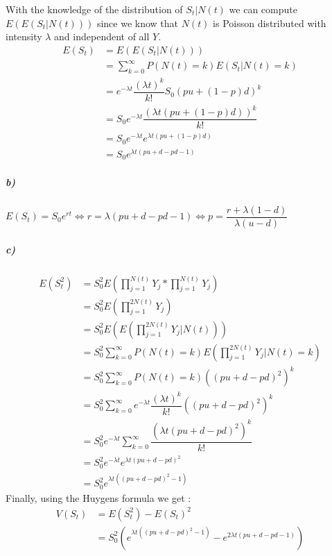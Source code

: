 \documentclass{article}
\begin{document}
With the knowledge of the distribution of $S_t|N(t)$ we can compute 
$E(E(S_t|N(t)))$ since we know that $N(t)$ is Poisson distributed with intensity $\lambda$ and independent of all $Y$.
\begin{align*}
 \displaystyle E(S_t)&=E(E(S_t|N(t))) \\
 &= \sum_{k=0}^{\infty} P(N(t)=k)E(S_t|N(t)=k) \\
 &=e^{-\lambda t}\dfrac{(\lambda t)^k}{k!}S_0(pu+(1-p)d)^k \\
 &=S_0 e^{-\lambda t}\dfrac{(\lambda t(pu+(1-p)d))^k}{k!} \\
 &=S_0e^{-\lambda t}e^{\lambda t(pu+(1-p)d)} \\
 &=S_0e^{\lambda t(pu+d-pd-1)} 
\end{align*}
\subparagraph{b)}
$E(S_t)=S_0e^{rt} \iff r=\lambda(pu+d-pd-1) \iff p=\dfrac{r+\lambda(1-d)}{\lambda(u-d)} $
\subparagraph{c)}
\begin{align*}
E(S_t^2)&=S_0^2E(\prod_{j=1}^{N(t)}Y_j*\prod_{j=1}^{N(t)}Y_j) \\
&=S_0^2E(\prod_{j=1}^{2N(t)}Y_j) \\
&=S_0^2E\left(E(\prod_{j=1}^{2N(t)}Y_j|N(t))\right) \\
&=S_0^2\sum_{k=0}^{\infty} P(N(t)=k)E(\prod_{j=1}^{2N(t)}Y_j|N(t)=k)\\
&=S_0^2\sum_{k=0}^{\infty} P(N(t)=k)((pu+d-pd)^2)^k \\
&=S_0^2\sum_{k=0}^{\infty} e^{-\lambda t} \dfrac{(\lambda t)^k}{k!}((pu+d-pd)^2)^k \\
&=S_0^2e^{-\lambda t}\sum_{k=0}^{\infty}  \dfrac{(\lambda t (pu+d-pd)^2 )^k}{k!} \\
&=S_0^2e^{-\lambda t}e^{\lambda t(pu+d-pd)^2} \\
&=S_0^2e^{\lambda t \left( (pu+d-pd)^2-1 \right)}
\end{align*}
Finally, using the Huygens formula we get :\\
\begin{align*}
V(S_t) &= E(S_t^2)-E(S_t)^2 \\
 &=S_0^2\left( e^{\lambda t((pu+d-pd)^2-1)}-e^{2\lambda t(pu+d-pd-1)} \right)
\end{align*}
\end{document}
